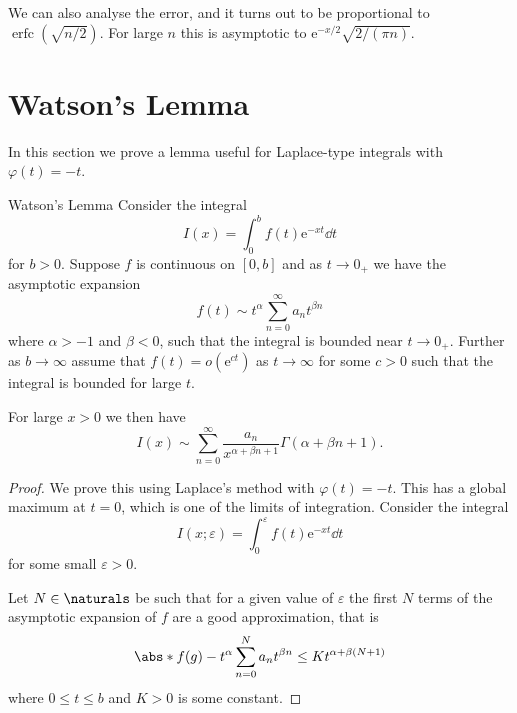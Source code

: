 \documentclass[fleqn]{NotesClass}
\newcommand*{\e}{\mathrm{e}}
\DeclareMathOperator{\erfc}{erfc}
\begin{document}
    We can also analyse the error, and it turns out to be proportional to \(\erfc(\sqrt{n/2})\).
    For large \(n\) this is asymptotic to \(\e^{-x/2}\sqrt{2/(\pi n)}\).
    
    \section{Watson's Lemma}
    In this section we prove a lemma useful for Laplace-type integrals with \(\varphi(t) = -t\).
    
    \begin{lma}{Watson's Lemma}{}
        Consider the integral
        \begin{equation}
            I(x) = \int_0^b f(t)\e^{-xt} \dd{t}
        \end{equation}
        for \(b > 0\).
        Suppose \(f\) is continuous on \([0, b]\) and as \(t \to 0_+\) we have the asymptotic expansion
        \begin{equation}
            f(t) \sim t^{\alpha} \sum_{n=0}^{\infty} a_nt^{\beta n}
        \end{equation}
        where \(\alpha > -1\) and \(\beta < 0\), such that the integral is bounded near \(t \to 0_+\).
        Further as \(b \to \infty\) assume that \(f(t) = o(\e^{ct})\) as \(t \to \infty\) for some \(c > 0\) such that the integral is bounded for large \(t\).
        
        For large \(x > 0\) we then have
        \begin{equation}
            I(x) \sim \sum_{n=0}^{\infty} \frac{a_n}{x^{\alpha+\beta n + 1}}\Gamma(\alpha + \beta n + 1).
        \end{equation}
        
        \begin{proof}
            We prove this using Laplace's method with \(\varphi(t) = -t\).
            This has a global maximum at \(t = 0\), which is one of the limits of integration.
            Consider the integral
            \begin{equation}
                I(x; \varepsilon) = \int_0^\varepsilon f(t) \e^{-xt}\dd{t}
            \end{equation}
            for some small \(\varepsilon > 0\).
            
            Let \(N \in \naturals\) be such that for a given value of \(\varepsilon\) the first \(N\) terms of the asymptotic expansion of \(f\) are a good approximation, that is
            \begin{equation}
                \abs*{f(g) - t^\alpha \sum_{n=0}^{N} a_n t^{\beta n}} \le K t^{\alpha + \beta(N + 1)}
            \end{equation}
            where \(0 \le t \le b\) and \(K > 0\) is some constant.
            

\end{proof}
\end{lma}
\end{document}
